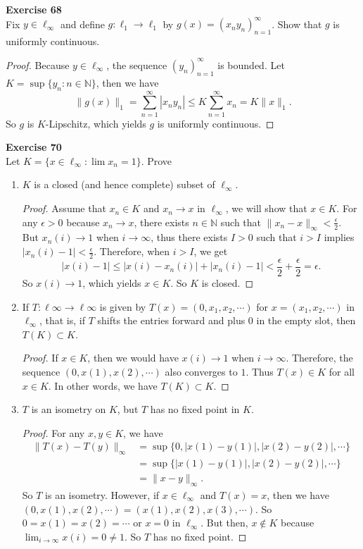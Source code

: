 \documentclass[12pt, a4paper]{article}
\theoremstyle{plain}
\newcommand{\N}{\mathbb{N}}
\newenvironment{exercise}[2][Exercise]
    { \begin{mdframed}[backgroundcolor=gray!20] \textbf{#1 #2} \\}
    {  \end{mdframed}}
\begin{document}
\begin{exercise}{68}
Fix $y\in\ell_\infty$ and define $g:\ell_1\rightarrow\ell_1$ by $g(x)=(x_ny_n)_{n=1}^\infty$. Show that $g$ is uniformly continuous.
\end{exercise}
	\begin{proof}
	Because $y\in\ell_\infty$, the sequence $(y_n)_{n=1}^\infty$ is bounded. Let $K=\sup\{y_n:n\in\N\}$, then we have
	\[
	\|g(x)\|_1=\sum_{n=1}^{\infty}{|x_ny_n|}\leq K\sum_{n=1}^{\infty}{x_n}=K\|x\|_1.
	\]
	So $g$ is $K$-Lipschitz, which yields $g$ is uniformly continuous.
	\end{proof}

\begin{exercise}{70}
Let $K=\{x\in \ell_\infty:\lim x_n=1\}$. Prove
\begin{enumerate}[label=(\alph*)]
\item $K$ is a closed (and hence complete) subset of $\ell_\infty$.
	\begin{proof}
	Assume that $x_n\in K$ and $x_n\rightarrow x$ in $\ell_\infty$, we will show that $x\in K$. For any $\epsilon>0$ because $x_n\rightarrow x$, there exists $n\in\N$ such that $\|x_n-x\|_\infty<\frac{\epsilon}{2}$. But $x_n(i)\rightarrow 1$ when $i\rightarrow \infty$, thus there exists $I>0$ such that $i>I$ implies $|x_n(i)-1|<\frac{\epsilon}{2}$. Therefore, when $i>I$, we get
	\[
	|x(i)-1|\leq |x(i)-x_n(i)|+|x_n(i)-1|<\frac{\epsilon}{2}+\frac{\epsilon}{2}=\epsilon.
	\]
	So $x(i)\rightarrow 1$, which yields $x\in K$. So $K$ is closed.
	\end{proof}
\item If $T: \ell\infty\rightarrow\ell\infty$ is given by $T(x)=(0,x_1,x_2,\cdots)$ for $x=(x_1,x_2,\cdots)$ in $\ell_\infty$, that is, if $T$ shifts the entries forward and plus $0$ in the empty slot, then $T(K)\subset K$.
	\begin{proof}
	If $x\in K$, then we would have $x(i)\rightarrow 1$ when $i\rightarrow \infty$. Therefore, the sequence $(0,x(1),x(2),\cdots)$ also converges to $1$. Thus $T(x)\in K$ for all $x\in K$. In other words, we have $T(K)\subset K$.
	\end{proof}

\item $T$ is an isometry on $K$, but $T$ has no fixed point in $K$.
	\begin{proof}
	For any $x,y\in K$, we have 
	\begin{align*}
	\|T(x)-T(y)\|_\infty&=\sup\{0,|x(1)-y(1)|,|x(2)-y(2)|,\cdots\}\\
	&=\sup\{|x(1)-y(1)|,|x(2)-y(2)|,\cdots\}\\
	&=\|x-y\|_\infty.
	\end{align*}
	So $T$ is an isometry. However, if $x\in\ell_\infty$ and $T(x)=x$, then we have $(0,x(1),x(2),\cdots)=(x(1),x(2),x(3),\cdots)$. So $0=x(1)=x(2)=\cdots$ or $x=0$ in $\ell_\infty$. But then, $x\not\in K$ because $\lim_{i\rightarrow\infty}x(i)=0\neq 1$. So $T$ has no fixed point.
	\end{proof}
\end{enumerate}
\end{exercise}
\end{document}
